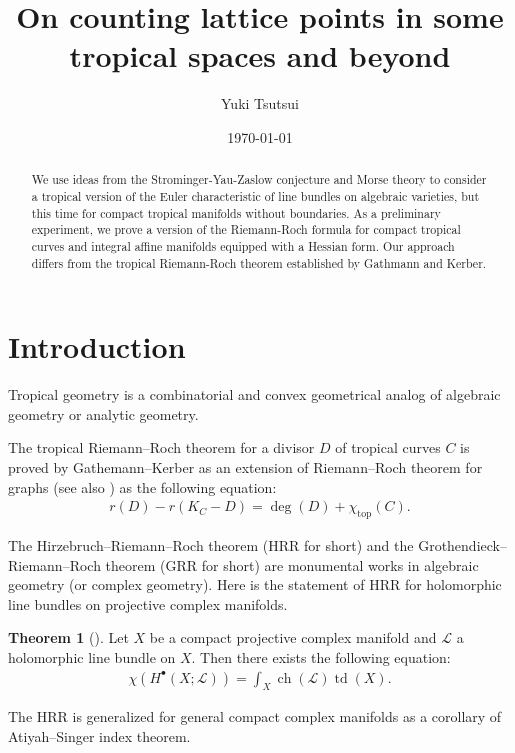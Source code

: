 \documentclass[a4paper,dvipdfmx,reqno,12pt]{amsart}
\title{On counting lattice points in some tropical spaces and beyond
}
\author[Y. Tsutsui]{Yuki Tsutsui}
\date{\today}
\theoremstyle{definition}
\newtheorem{theorem}{Theorem}[section]
\newcommand{\opn}[1]{\operatorname{#1}}
\numberwithin{equation}{section}
\begin{document}
\begin{abstract}
We use ideas from the Strominger-Yau-Zaslow conjecture and 
Morse theory to consider a tropical version of the Euler 
characteristic of line bundles on algebraic varieties, 
but this time for compact tropical manifolds without 
boundaries. As a preliminary experiment,
we prove a version of the Riemann-Roch formula 
for compact tropical curves and integral affine 
manifolds equipped with a Hessian form. 
Our approach differs from the tropical Riemann-Roch 
theorem established by Gathmann and Kerber.
\end{abstract}
\maketitle
\section{Introduction}


Tropical geometry is a combinatorial and convex 
geometrical analog of
algebraic geometry or analytic geometry.


The tropical Riemann--Roch theorem for a 
divisor $D$ of tropical curves $C$ is proved 
by Gathemann--Kerber \cite{gathmannRiemannRochTheoremTropical2008a}
as an extension of Riemann--Roch theorem for graphs
\cite{MR2355607} (see also 
\cite{mikhalkinTropicalCurvesTheir2008a}) as 
the following equation: 
\begin{align}
r(D)-r(K_C-D)=\opn{deg}(D)+\chi_{\opn{top}}(C).
\end{align}


The Hirzebruch--Riemann--Roch theorem (HRR for short) and 
the Grothendieck--Riemann--Roch theorem (GRR for short) 
are monumental works in
algebraic geometry (or complex geometry). 
Here is the statement of HRR for holomorphic line bundles on 
projective complex manifolds.
\begin{theorem}[{\cite{MR0202713}}]
Let $X$ be a compact projective complex manifold and
$\mathcal{L}$ a holomorphic line bundle on $X$.
Then there exists the following equation:
\begin{align} \label{equation-HRR}
\chi(H^{\bullet}(X;\mathcal{L}))
=\int_X \opn{ch}(\mathcal{L})\opn{td}(X).
\end{align}
\end{theorem}

The HRR is generalized for 
general compact complex 
manifolds as a corollary of Atiyah--Singer index 
theorem.
\end{document}
